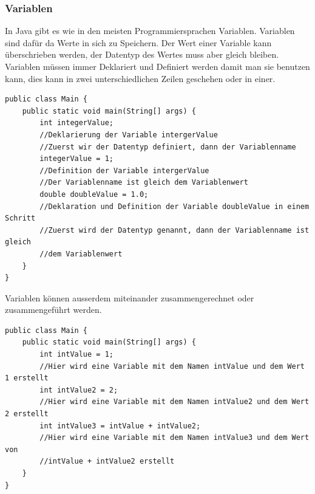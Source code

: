 \subsubsection{Variablen}
In Java gibt es wie in den meisten Programmiersprachen Variablen. Variablen sind dafür da Werte in sich zu Speichern. Der Wert einer Variable kann überschrieben werden, der Datentyp des Wertes muss aber gleich bleiben. Variablen müssen immer Deklariert und Definiert werden damit man sie benutzen kann, dies kann in zwei unterschiedlichen Zeilen geschehen oder in einer.
\begin{verbatim}
public class Main {
    public static void main(String[] args) {
        int integerValue;
        //Deklarierung der Variable intergerValue
        //Zuerst wir der Datentyp definiert, dann der Variablenname
        integerValue = 1;
        //Definition der Variable intergerValue
        //Der Variablenname ist gleich dem Variablenwert
        double doubleValue = 1.0;
        //Deklaration und Definition der Variable doubleValue in einem Schritt
        //Zuerst wird der Datentyp genannt, dann der Variablenname ist gleich 
        //dem Variablenwert
    }
}
\end{verbatim}
Variablen können ausserdem miteinander zusammengerechnet oder zusammengeführt werden\cite{programmieren_lernen_java_2021}.
\begin{verbatim}
public class Main {
    public static void main(String[] args) {
        int intValue = 1;
        //Hier wird eine Variable mit dem Namen intValue und dem Wert 1 erstellt
        int intValue2 = 2;
        //Hier wird eine Variable mit dem Namen intValue2 und dem Wert 2 erstellt
        int intValue3 = intValue + intValue2;
        //Hier wird eine Variable mit dem Namen intValue3 und dem Wert von 
        //intValue + intValue2 erstellt
    }
}
\end{verbatim}

